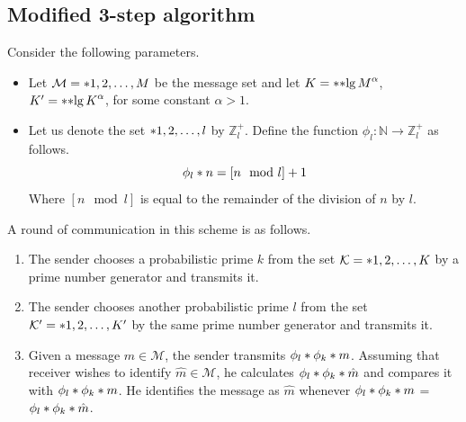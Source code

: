 \subsection{Modified 3-step algorithm}\label{subsec:modified3step}
Consider the following parameters.
\begin{itemize}
	\item Let \(\mathcal{M} = \set{1,2, \dots, M }\) be the message set and let \(K = \ceil{\bracket{\lg M}^{\alpha}}\), \(K' = \ceil{\bracket{\lg K}^{\alpha}}\),  for some constant \(\alpha > 1\). 
	\item Let us denote the set \(\set{1,2, \dots, l }\) by \(\mathbb{Z}^+_l\).  Define the function \(\phi_l: \mathbb{N} \to \mathbb{Z}_{l}^+ \) as follows.
	\begin{equation}
		\func{\phi_l}{n}= [n \mod l] + 1
	\end{equation}
	Where \([n \mod l]\) is equal to the remainder of the division of \(n\) by \(l\).
\end{itemize}

A round of communication in this scheme is as follows.
\begin{enumerate}
	\item The sender chooses a probabilistic prime \(k\) from the set \(\mathcal{K} = \set{1,2,\dots, K}\) by a prime number generator and transmits it.
	\item The sender chooses another probabilistic prime \(l\) from the set \( \mathcal{K}' = \set{1,2,\dots, K'}\) by the same prime number generator and transmits it.
	\item Given a message \(m \in \mathcal{M}\), the sender transmits \(\func{\phi_l}{\func{\phi_k}{m}}\). Assuming that receiver wishes to identify \(\hat{m} \in \mathcal{M}\), he calculates \(\func{\phi_l}{\func{\phi_k}{\hat{m}}}\) and compares it with \(\func{\phi_l}{\func{\phi_k}{m}}\). He identifies the message as \(\hat{m}\) whenever \(\func{\phi_l}{\func{\phi_k}{m}}\) = \(\func{\phi_l}{\func{\phi_k}{\hat{m}}}\).
\end{enumerate}

